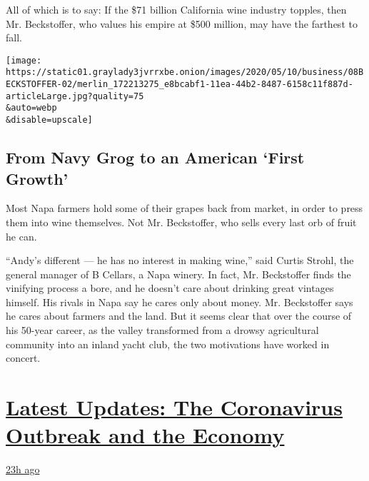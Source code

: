 All of which is to say: If the \$71 billion California wine industry
topples, then Mr. Beckstoffer, who values his empire at \$500 million,
may have the farthest to fall.

\texttt{[image: https://static01.graylady3jvrrxbe.onion/images/2020/05/10/business/08BECKSTOFFER-02/merlin\_172213275\_e8bcabf1-11ea-44b2-8487-6158c11f887d-articleLarge.jpg?quality=75\\\&auto=webp\\\&disable=upscale]}

\hypertarget{from-navy-grog-to-an-american-first-growth}{%
\subsection{From Navy Grog to an American `First
Growth'}\label{from-navy-grog-to-an-american-first-growth}}

Most Napa farmers hold some of their grapes back from market, in order
to press them into wine themselves. Not Mr. Beckstoffer, who sells every
last orb of fruit he can.

``Andy's different --- he has no interest in making wine,'' said Curtis
Strohl, the general manager of B Cellars, a Napa winery. In fact, Mr.
Beckstoffer finds the vinifying process a bore, and he doesn't care
about drinking great vintages himself. His rivals in Napa say he cares
only about money. Mr. Beckstoffer says he cares about farmers and the
land. But it seems clear that over the course of his 50-year career, as
the valley transformed from a drowsy agricultural community into an
inland yacht club, the two motivations have worked in concert.

\hypertarget{latest-updates-the-coronavirus-outbreak-and-the-economy}{%
\section{\texorpdfstring{\href{https://www.nytimes3xbfgragh.onion/live/2020/09/11/business/stock-market-today-coronavirus?action=click\&pgtype=Article\&state=default\&region=MAIN_CONTENT_1\&context=storylines_live_updates}{Latest
Updates: The Coronavirus Outbreak and the
Economy}}{Latest Updates: The Coronavirus Outbreak and the Economy}}\label{latest-updates-the-coronavirus-outbreak-and-the-economy}}

\href{https://www.nytimes3xbfgragh.onion/live/2020/09/11/business/stock-market-today-coronavirus?action=click\&pgtype=Article\&state=default\&region=MAIN_CONTENT_1\&context=storylines_live_updates\#the-nyse-may-move-its-data-center-out-of-new-jersey-in-response-to-a-proposed-tax}{23h
ago}

